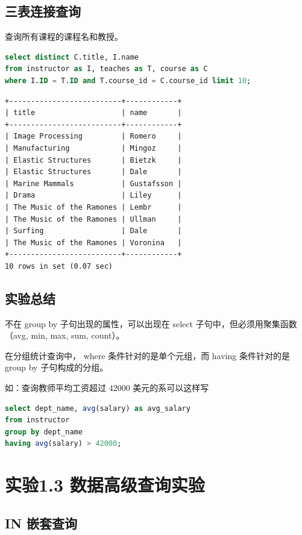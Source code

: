 \documentclass{article}
\begin{document}
\subsection{三表连接查询}

查询所有课程的课程名和教授。

\begin{lstlisting}[language=sql]
select distinct C.title, I.name
from instructor as I, teaches as T, course as C
where I.ID = T.ID and T.course_id = C.course_id limit 10;
\end{lstlisting}

\begin{lstlisting}
+--------------------------+------------+
| title                    | name       |
+--------------------------+------------+
| Image Processing         | Romero     |
| Manufacturing            | Mingoz     |
| Elastic Structures       | Bietzk     |
| Elastic Structures       | Dale       |
| Marine Mammals           | Gustafsson |
| Drama                    | Liley      |
| The Music of the Ramones | Lembr      |
| The Music of the Ramones | Ullman     |
| Surfing                  | Dale       |
| The Music of the Ramones | Voronina   |
+--------------------------+------------+
10 rows in set (0.07 sec)
\end{lstlisting}

\subsection{实验总结}

不在 group by 子句出现的属性，可以出现在 select 子句中，但必须用聚集函数（avg, min, max, sum, count）。

在分组统计查询中， where 条件针对的是单个元组，而 having 条件针对的是 group by 子句构成的分组。

如：查询教师平均工资超过 42000 美元的系可以这样写

\begin{lstlisting}[language=sql]
select dept_name, avg(salary) as avg_salary
from instructor
group by dept_name
having avg(salary) > 42000;
\end{lstlisting}

\section{实验1.3 数据高级查询实验}

\subsection{IN 嵌套查询}
\end{document}
